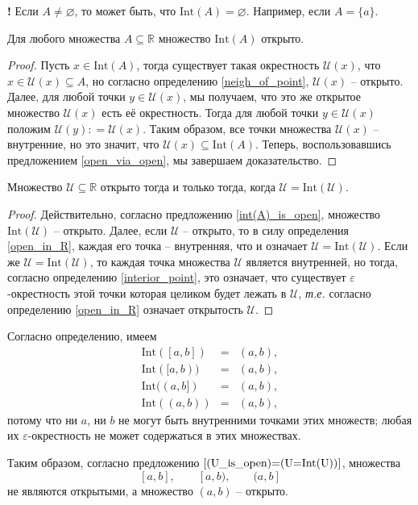 \begin{mydanger}{\bf !}
    Если $A \ne \varnothing$, то может быть, что $\mathrm{Int}(A) = \varnothing$. Например, если $A =\{a\}$.
\end{mydanger}


\begin{proposition}\label{int(A)_is_open}
    Для любого множества $A \subseteq \mathbb{R}$ множество $\mathrm{Int}(A)$ открыто.
\end{proposition}
\begin{proof}
Пусть $x \in \mathrm{Int}(A)$, тогда существует такая окрестность $\mathscr{U}(x)$, что $x\in \mathscr{U}(x) \subseteq A$, но согласно определению \ref{neigh_of_point}, $\mathscr{U}(x)$ -- открыто. Далее, для любой точки $y\in \mathscr{U}(x)$, мы получаем, что это же открытое множество $\mathscr{U}(x)$ есть её окрестность. Тогда для любой точки $y\in \mathscr{U}(x)$ положим $\mathscr{U}(y): = \mathscr{U}(x)$. Таким образом, все точки множества $\mathscr{U}(x)$ -- внутренние, но это значит, что $\mathscr{U}(x) \subseteq \mathrm{Int}(A)$. Теперь, воспользовавшись предложением \ref{open_via_open}, мы завершаем доказательство.
\end{proof}



\begin{proposition}\label{(U_is_open)=(U=Int(U))}
    Множество $\mathscr{U} \subseteq \mathbb{R}$ открыто тогда и только тогда, когда $\mathscr{U} = \mathrm{Int}(\mathscr{U}).$
\end{proposition}

\begin{proof}
    Действительно, согласно предложению \ref{int(A)_is_open}, множество $\mathrm{Int}(\mathscr{U})$ -- открыто. Далее, если $\mathscr{U}$ -- открыто, то в силу определения \ref{open_in_R}, каждая его точка -- внутренняя, что и означает $\mathscr{U} = \mathrm{Int}(\mathscr{U})$. Если же $\mathscr{U} = \mathrm{Int}(\mathscr{U})$, то каждая точка множества $\mathscr{U}$ является внутренней, но тогда, согласно определению \ref{interior_point}, это означает, что существует $\varepsilon$-окрестность этой точки которая целиком будет лежать в $\mathscr{U}$, \textit{т.е.} согласно определению \ref{open_in_R} означает открытость $\mathscr{U}$.
\end{proof}

\begin{example}\label{(a,b)c(open}
    Согласно определению, имеем
    \begin{eqnarray*}
        \mathrm{Int}([a,b]) &=& (a,b),\\
        \mathrm{Int}([a,b)) &=& (a,b),\\
        \mathrm{Int}((a,b]) &=& (a,b),\\
        \mathrm{Int}((a,b)) &=& (a,b),
    \end{eqnarray*}
потому что ни $a$, ни $b$ не могут быть внутренними точками этих множеств; любая их $\varepsilon$-окрестность не может содержаться в этих множествах.

Таким образом, согласно предложению $\ref{(U_is_open)=(U=Int(U))}$, множества
\[
 [a,b], \qquad [a,b), \qquad (a,b]
\]
не являются открытыми, а множество $(a,b)$ -- открыто.
\end{example}

